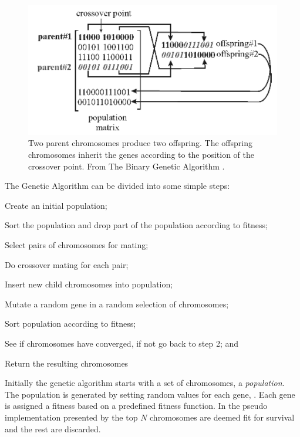 \begin{figure}[!h]
  \begin{center}
    \includegraphics[totalheight=0.175\textheight]{figures/crossover}
  \end{center}
  \caption{Two parent chromosomes produce two offspring. The offspring chromosomes inherit the genes according to the position of the crossover point. From The Binary Genetic Algorithm \protect \cite[p. 42]{Haupt2004a}.}
  \label{fig:crossover}
\end{figure}

The Genetic Algorithm can be divided into some simple steps:
\begin{inparaenum}[\itshape 1\upshape)]
\item Create an initial population;
\item Sort the population and drop part of the population according to fitness;
\item Select pairs of chromosomes for mating;
\item Do crossover mating for each pair;
\item Insert new child chromosomes into population;
\item Mutate a random gene in a random selection of chromosomes;
\item Sort population according to fitness;
\item See if chromosomes have converged, if not go back to step 2; and
\item Return the resulting chromosomes
\end{inparaenum}

Initially the genetic algorithm starts with a set of chromosomes, a \textit{population}. The population is generated by setting random values for each gene, \parencite{Haupt2004a,Negnevitsky2002,Goldberg1989}. Each gene is assigned a fitness based on a predefined fitness function. In the pseudo implementation presented by \citeauthor{Haupt2004a} the top \(N\) chromosomes are deemed fit for survival and the rest are discarded.

